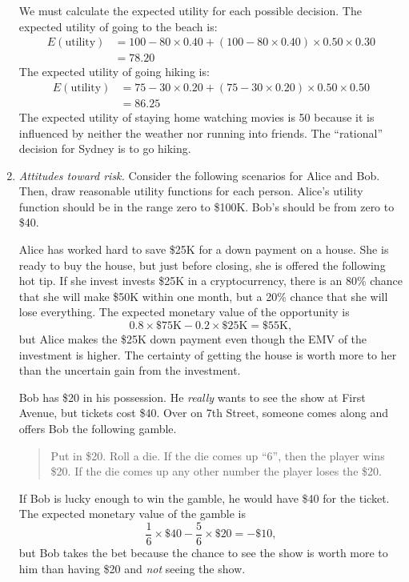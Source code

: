 \begin{enumerate}
\begin{solution}
\bs We must calculate the expected utility for each possible decision.
The expected utility of going to the beach is:
\begin{align*}
E(\text{utility}) &= 100 - 80 \times 0.40 + 
(100 - 80 \times 0.40) \times 0.50 \times 0.30 \\
&= 78.20
\end{align*}
The expected utility of going hiking is:
\begin{align*}
E(\text{utility}) &= 75 - 30 \times 0.20 + (75 - 30 \times 0.20) \times 0.50 \times 0.50 \\
&= 86.25
\end{align*}
The expected utility of staying home watching movies is 50 because it
is influenced by neither the weather nor running into friends. The
``rational'' decision for Sydney is to go hiking.
\end{solution}

\item \emph{Attitudes toward risk.}  Consider the following scenarios
  for Alice and Bob. Then, draw reasonable utility functions for each
  person. Alice's utility function should be in the range zero to
  \$100K.  Bob's should be from zero to \$40.

  Alice has worked hard to save \$25K for a down payment on a
  house. She is ready to buy the house, but just before closing, she
  is offered the following hot tip. If she invest invests \$25K in a
  cryptocurrency, there is an 80\% chance that she will make \$50K
  within one month, but a 20\% chance that she will lose everything.
  The expected monetary value of the opportunity is
  \[
  0.8 \times \$75\text{K} - 0.2 \times \$25\text{K} = \$55\text{K},
  \]
  but Alice makes the \$25K down payment even though the EMV of the
  investment is higher. The certainty of getting the house is worth
  more to her than the uncertain gain from the investment.

  Bob has \$20 in his possession. He \emph{really} wants to see the
  show at First Avenue, but tickets cost \$40. Over on 7th Street,
  someone comes along and offers Bob the following gamble.
\begin{quote}
  Put in \$20. Roll a die. If the die comes up ``6'', then the player
  wins \$20. If the die comes up any other number the player loses the
  \$20.
\end{quote}
If Bob is lucky enough to win the gamble, he would have \$40 for the
ticket. The expected monetary value of the gamble is
  \[
  \frac{1}{6} \times \$40 - \frac{5}{6} \times \$20 = -\$10,
  \]
  but Bob takes the bet because the chance to see the show is worth
  more to him than having \$20 and \emph{not} seeing the show.


\end{enumerate}

